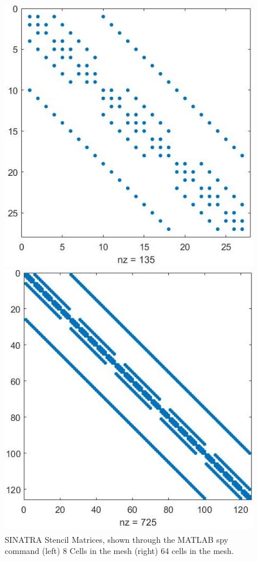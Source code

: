 \begin{figure}
    \centering
  \begin{minipage}[b]{0.49\textwidth}
    \includegraphics[width=\textwidth]{figures/sparse_8.jpg}
  \end{minipage} %
  \begin{minipage}[b]{0.49\textwidth}
    \includegraphics[width=\textwidth]{figures/sparse_64.jpg}

  \end{minipage}
  \caption[Sparse Stencil Matrix]{SINATRA Stencil Matrices, shown through the MATLAB\textsuperscript{\textregistered} spy command (left) 8 Cells in the mesh (right) 64 cells in the mesh.}
  \label{fig:sparse}
\end{figure}


